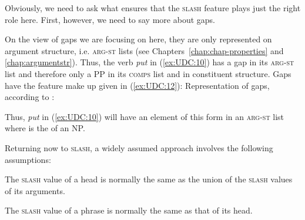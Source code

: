 \documentclass[output=paper
,notxmath 
 	        ,biblatex
                ,babelshorthands
                ,newtxmath
                ,draftmode
                ,colorlinks, citecolor=brown
]{langscibook}
\begin{document}

Obviously, we need to ask what ensures that the \textsc{slash} feature plays just
the right role here. First, however, we need to say more about gaps.

On the view of gaps we are focusing on here, they are only represented
on argument structure, i.e. 
\textsc{arg-st} lists (see Chapters~\ref{chap:chap-properties} and \ref{chap:argumentstr}). Thus, the verb \emph{put} in (\ref{ex:UDC:10})
 has a gap in its
\textsc{arg-st} list and therefore only a PP in its \textsc{comps} list and
in constituent structure. Gaps have the feature make up given in
(\ref{ex:UDC:12}):
\ea
\label{ex:UDC:12}
Representation of gaps, according to \citet[161]{Pollard:Sag:94}:\\
\z  


\noindent
Thus, \emph{put} in (\ref{ex:UDC:10}) will have an element of this
form in an \textsc{arg-st} list where  is the \localv of an
NP.

Returning now to \textsc{slash}, a widely assumed approach involves the following
assumptions:

\eal
\label{ex:UDC:13}
\ex
The \textsc{slash} value of a head is normally the same as the union of the \textsc{slash} values of its
arguments.

\ex
The \textsc{slash} value of a phrase is normally the same as that of its head.
\zl
\end{document}

